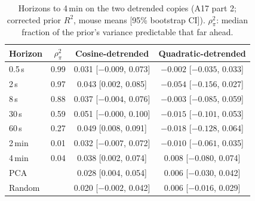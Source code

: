 \documentclass{article}
\begin{document}
\begin{table}[H]
  \caption{Horizons to 4\,min on the two detrended copies (A17 part 2; corrected prior $R^2$, mouse means [95\%
  bootstrap CI]). $\rho_\pi^2$: median fraction of the prior's variance predictable that far ahead.}
  \label{tab:longlag}
  \centering\small
  \begin{tabular}{lccc}
    \toprule
    Horizon & $\rho_\pi^2$ & Cosine-detrended & Quadratic-detrended \\
    \midrule
    0.5\,s & 0.99 & 0.031 [$-0.009$, 0.073] & $-0.002$ [$-0.035$, 0.033] \\
    2\,s   & 0.97 & 0.043 [0.002, 0.085] & $-0.054$ [$-0.156$, 0.027] \\
    8\,s   & 0.88 & 0.037 [$-0.004$, 0.076] & $-0.003$ [$-0.085$, 0.059] \\
    30\,s  & 0.59 & 0.051 [$-0.000$, 0.100] & $-0.015$ [$-0.101$, 0.053] \\
    60\,s  & 0.27 & 0.049 [0.008, 0.091] & $-0.018$ [$-0.128$, 0.064] \\
    2\,min & 0.01 & 0.032 [$-0.007$, 0.072] & $-0.010$ [$-0.061$, 0.035] \\
    4\,min & 0.04 & 0.038 [0.002, 0.074] & 0.008 [$-0.080$, 0.074] \\
    PCA    &      & 0.028 [0.004, 0.054] & 0.006 [$-0.030$, 0.042] \\
    Random &      & 0.020 [$-0.002$, 0.042] & 0.006 [$-0.016$, 0.029] \\
    \bottomrule
  \end{tabular}
\end{table}
\end{document}
